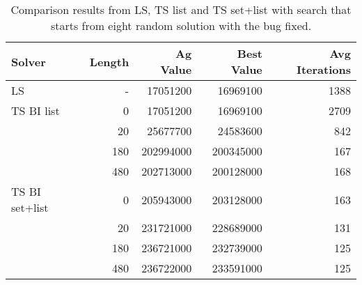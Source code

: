\documentclass[]{article}
\begin{document}
	\begin{table}[]
		\centering
		\begin{tabular}{lrrrr}
			\toprule
			\textbf{Solver} & \textbf{Length} & \textbf{Ag Value} & \textbf{Best Value} & \textbf{Avg Iterations} \\
			\toprule
			LS              & -                                   & 17051200                              & 16969100                                & 1388                                        \\
			\midrule
			TS BI list      & 0                                   & 17051200                              & 16969100                                & 2709                                        \\
			& 20                                  & 25677700                              & 24583600                                & 842                                         \\
			& 180                                 & 202994000                             & 200345000                               & 167                                         \\
			& 480                                 & 202713000                             & 200128000                               & 168                                         \\
			\midrule
			TS BI set+list  & 0                                   & 205943000                             & 203128000                               & 163 \\
			& 20                                  & 231721000                             & 228689000                               & 131 \\
			& 180                                 & 236721000                             & 232739000                               & 125  \\
			& 480                                 & 236722000                             & 233591000                               & 125  \\
			\bottomrule
		\end{tabular}
		\caption{Comparison results from LS, TS list and TS set+list with search that starts from eight random solution with the bug fixed.}
		\label{tab:8initrnd_2}
	\end{table}
	

\newpage
		
\end{document}
